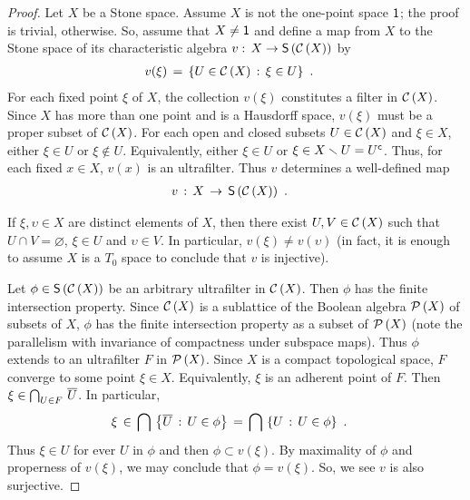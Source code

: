 \begin{proof}
	Let $X$ be a Stone space. Assume $X$ is not the one-point space
	$\mathsf{1}$; the proof is trivial, otherwise. So, assume that
	$X\not=\mathsf{1}$ and define a map from $X$ to the Stone space of
	its characteristic algebra $v:\,X\rightarrow\mathsf{S}\left(\mathcal{C}\left(X\right)\right)$
	by
	\begin{align*}
		v(\xi) & \,=\, \left\lbrace U\in\mathcal{C}\left(X\right)
			\,:\, \xi\in U\right\rbrace
		\text{ .}
	\end{align*}
	For each fixed point $\xi$ of $X$, the collection $v(\xi)$
	constitutes a filter in $\mathcal{C}\left(X\right)$. Since $X$ has more than
	one point and is a Hausdorff space, $v(\xi)$ must be a proper
	subset of $\mathcal{C}\left(X\right)$. For each open and closed subsets
	$U\in\mathcal{C}\left(X\right)$ and $\xi\in X$, either $\xi\in U$ or
	$\xi\not\in U$. Equivalently, either $\xi\in U$ or
	$\xi\in X\smallsetminus U={U}^{\mathsf{c}}$. Thus, for each fixed $x\in X$,
	$v(x)$ is an ultrafilter. Thus $v$ determines a well-defined map
	\begin{align*}
		v & \,:\, X\,\rightarrow\,\mathsf{S}\left(\mathcal{C}\left(X\right)\right)
		\text{ .}
	\end{align*}

	If $\xi,\upsilon\in X$ are distinct elements of $X$, then there
	exist $U,V\in\mathcal{C}\left(X\right)$ such that $U\cap V=\varnothing$,
	$\xi\in U$ and $\upsilon\in V$. In particular,
	$v(\xi)\not =v(\upsilon)$ (in fact, it is enough to assume $X$ is
	a $T_{0}$ space to conclude that $v$ is injective).

	Let $\phi\in\mathsf{S}\left(\mathcal{C}\left(X\right)\right)$ be an arbitrary ultrafilter in
	$\mathcal{C}\left(X\right)$. Then $\phi$ has the finite intersection property.
	Since $\mathcal{C}\left(X\right)$ is a sublattice of the Boolean algebra
	$\mathcal{P}\left(X\right)$ of subsets of $X$, $\phi$ has the finite intersection
	property as a subset of $\mathcal{P}\left(X\right)$ (note the parallelism with
	invariance of compactness under subspace maps). Thus $\phi$
	extends to an ultrafilter $F$ in $\mathcal{P}\left(X\right)$. Since $X$ is a
	compact topological space, $F$ converge to some point $\xi\in X$.
	Equivalently, $\xi$ is an adherent point of $F$. Then
	$\xi\in\bigcap_{U\in F}\,\overline{U}$. In particular,
	\begin{align*}
		\xi & \,\in\,\bigcap\,\left\lbrace \overline{U}
			\,:\, U\in\phi\right\rbrace
		\,=\,\bigcap\,\left\lbrace U
			\,:\, U\in\phi\right\rbrace
		\text{ .}
	\end{align*}
	Thus $\xi\in U$ for ever $U$ in $\phi$ and then $\phi\subset v(\xi)$.
	By maximality of $\phi$ and properness of $v(\xi)$, we may conclude
	that $\phi=v(\xi)$. So, we see $v$ is also surjective.


\end{proof}
